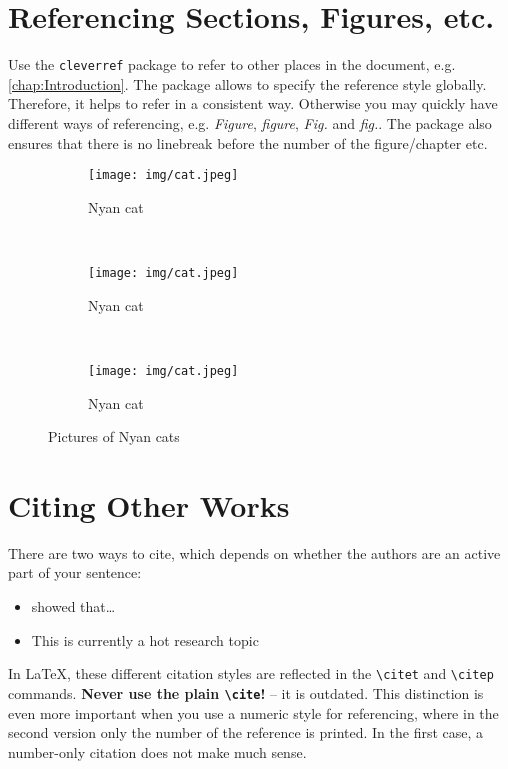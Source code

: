 \documentclass[8pt, %
a5paper, %
twoside, %
openright, %
abstract=off, %
DIV=11,      %
BCOR=8mm]{scrbook} %
\begin{document}
    \section{Referencing Sections, Figures, etc.}
    Use  the \verb+cleverref+  package to  refer  to other  places in  the 
    document,  e.g.  \cref{chap:Introduction}.    The  package  allows  to 
    specify the reference style globally.  Therefore, it helps to refer in 
    a consistent  way.  Otherwise you  may quickly have different  ways of 
    referencing,   e.g.  \emph{Figure},   \emph{figure},  \emph{Fig.}   and
    \emph{fig.}.   The package  also ensures  that there  is no  linebreak 
    before the number of the figure/chapter etc.                           

    \begin{figure}
        \centering
        \begin{subfigure}[b]{0.3\textwidth}
            \texttt{[image: img/cat.jpeg]}
            \caption{Nyan cat}
            \label{fig:cat1}
        \end{subfigure}%
        ~ %
        \begin{subfigure}[b]{0.3\textwidth}
            \texttt{[image: img/cat.jpeg]}
            \caption{Nyan cat}
            \label{fig:cat2} 
        \end{subfigure}
        ~ %
        \begin{subfigure}[b]{0.3\textwidth}
            \texttt{[image: img/cat.jpeg]}
            \caption{Nyan cat}
            \label{fig:cat3}  
        \end{subfigure}
        \caption[Nyan cats]{Pictures of Nyan cats}\label{fig:cats}
    \end{figure}



    \section{Citing Other Works}
    There are two ways to cite, which depends on whether the authors are an
    active part of your sentence:
    \begin{itemize}[noitemsep]
        \item \citet{muster} showed that\ldots{}
        \item This is currently a hot research topic \citep{muster}
    \end{itemize}
    In  \LaTeX{}, these  different  citation styles  are  reflected in  the
    \texttt{\textbackslash citet}  and  \texttt{\textbackslash citep}  commands. \textbf{Never  use  the  plain
    \texttt{\textbackslash cite}!} -- it is outdated.
    This distinction  is even more important  when you use a  numeric style
    for referencing, where in the second version only the number of the 
    reference is printed.   In the first case, a  number-only citation does
    not make much sense.
\end{document}
